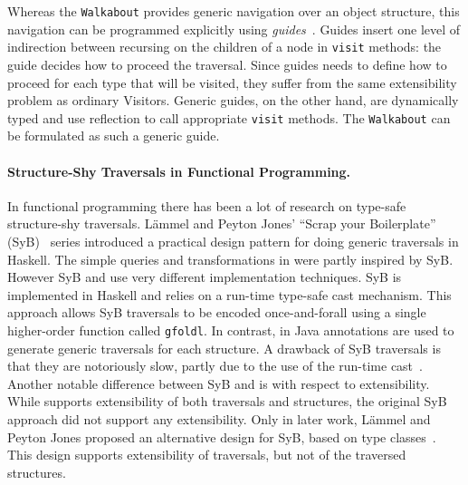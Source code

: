 Whereas the \lstinline{Walkabout} provides generic navigation over an object structure, this navigation can be programmed explicitly using \textit{guides}~\cite{bravenboer2001guiding}.
Guides insert one level of indirection between recursing on the children of a node in \lstinline{visit} methods: the guide decides how to proceed the traversal.
Since guides needs to define how to proceed for each type that will be visited, they suffer from the same extensibility problem
as ordinary Visitors.
Generic guides, on the other hand, are dynamically typed and use reflection to call appropriate \lstinline{visit} methods.
The \lstinline{Walkabout} can be formulated as such a generic guide.





\paragraph{Structure-Shy Traversals in Functional Programming.}

In
functional programming there has been a lot of research on type-safe
structure-shy traversals. L\"ammel and Peyton Jones' ``Scrap your
Boilerplate'' (SyB)~\cite{ralf03syb,lammel04syb,lammel05syb} series
introduced a practical design pattern for doing generic
traversals in Haskell. The simple queries and transformations in
\name were partly inspired by SyB. However SyB and \name use very
different implementation techniques. SyB is implemented in Haskell and
relies on a run-time type-safe cast mechanism. This approach allows
SyB traversals to be encoded once-and-forall using a single
higher-order function called \lstinline{gfoldl}. In contrast, in \name
Java annotations are used to generate generic traversals for each
structure. A drawback of SyB traversals is that they are notoriously
slow, partly due to the use of the run-time
cast~\cite{adams2012tyb}. Another notable difference between SyB and
\name is with respect to extensibility. While \name supports
extensibility of both traversals and structures, the original SyB
approach did not support any extensibility. Only in later work,
L\"ammel and Peyton Jones proposed an alternative design for SyB,
based on type classes~\cite{wadler89type-classes}.
This design supports extensibility of traversals, but not of the
traversed structures.


